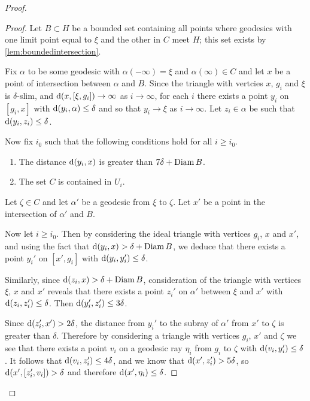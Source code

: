 \documentclass[a4paper]{article}
\begin{document}
\begin{proof}
\begin{proof}
  Let $B\subset H$ be a bounded set containing all points where geodesics with
  one limit point equal to $\xi$ and the other in $C$ meet $H$; this set exists
  by \cref{lem:boundedintersection}.

  Fix $\alpha$ to be some geodesic with $\alpha(-\infty)=\xi$ and
  $\alpha(\infty)\in C$ and let $x$ be a point of intersection between $\alpha$
  and $B$. Since the triangle with vertcies $x$, $g_i$ and $\xi$ is
  $\delta$-slim, and $\operatorname{d}(x, [\xi, g_i]) \to \infty$ as $i\to\infty$, for
  each $i$ there exists a point $y_i$ on $[g_i, x]$ with $\operatorname{d}(y_i, \alpha)
  \leq \delta$ and so that $y_i \to \xi$ as $i\to\infty$. Let $z_i \in \alpha$
  be such that $\operatorname{d}(y_i, z_i)\leq\delta$.
  
  Now fix $i_0$ such that the following conditions hold for all $i\geq 
  i_0$.
  \begin{enumerate}
    \item The distance $\operatorname{d}(y_i,x)$ is greater than $7\delta + \operatorname{Diam} B$.
    \item The set $C$ is contained in $U_i$.
  \end{enumerate}

  Let $\zeta \in C$ and let $\alpha'$ be a geodesic from $\xi$ to $\zeta$. Let 
  $x'$ be a point in the intersection of $\alpha'$ and $B$. 

  Now let $i\geq i_0$. Then by considering the ideal triangle with vertices
  $g_i$, $x$ and $x'$, and using the fact that $\operatorname{d}(y_i, x) > \delta + \operatorname{Diam}
  B$, we deduce that there exists a point $y_i'$ on $[x', g_i]$ with
  $\operatorname{d}(y_i, y_i') \leq \delta$.

  Similarly, since $\operatorname{d}(z_i, x) > \delta + \operatorname{Diam} B$, consideration of the
  triangle with vertices $\xi$, $x$ and $x'$ reveals that there exists a point
  $z_i'$ on $\alpha'$ between $\xi$ and $x'$ with $\operatorname{d}(z_i, z_i') \leq
  \delta$. Then $\operatorname{d}(y_i', z_i') \leq 3\delta$.

  Since $\operatorname{d}(z_i', x') > 2\delta$, the distance from $y_i'$ to the subray of
  $\alpha'$ from $x'$ to $\zeta$ is greater than $\delta$. Therefore by
  considering a triangle with vertices $g_i$, $x'$ and $\zeta$ we see that
  there exists a point $v_i$ on a geodesic ray $\eta_i$ from $g_i$ to $\zeta$
  with $\operatorname{d}(v_i, y_i') \leq \delta$. It follows that $\operatorname{d}(v_i, z_i') \leq
  4\delta$, and we know that $\operatorname{d}(x', z_i') > 5\delta$, so $\operatorname{d}(x', [z_i',
  v_i]) > \delta$ and therefore $\operatorname{d}(x', \eta_i) \leq \delta$.


\end{proof}
\end{proof}
\end{document}

